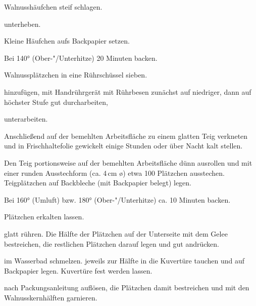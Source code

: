 \begin{recipe}{Walnusshäufchen}
  steif schlagen.

  unterheben.

  Kleine Häufchen aufs Backpapier setzen.

  Bei 140° (Ober-"/Unterhitze) 20 Minuten backen.
\end{recipe}



\begin{recipe}{Walnussplätzchen}
  in eine Rührschüssel sieben.

  hinzufügen, mit Handrührgerät mit Rührbesen zunächst auf niedriger,
  dann auf höchster Stufe gut durcharbeiten,

  unterarbeiten.

  Anschließend auf der bemehlten Arbeitsfläche zu einem glatten Teig
  verkneten und in Frischhaltefolie gewickelt einige Stunden oder über
  Nacht kalt stellen.

  Den Teig portionsweise auf der bemehlten Arbeitsfläche dünn ausrollen
  und mit einer runden Ausstechform (ca. 4\,cm \o) etwa 100 Plätzchen
  ausstechen. Teigplätzchen auf Backbleche (mit Backpapier belegt)
  legen.

  Bei 160° (Umluft) bzw. 180° (Ober-"/Unterhitze) ca. 10 Minuten backen.

  Plätzchen erkalten lassen.

  glatt rühren.
  Die Hälfte der Plätzchen auf der Unterseite mit dem Gelee bestreichen,
  die restlichen Plätzchen darauf legen und gut andrücken.

  im Wasserbad schmelzen.
  jeweils zur Hälfte in die Kuvertüre tauchen und auf Backpapier legen.
  Kuvertüre fest werden lassen.

  nach Packungsanleitung auflösen, die Plätzchen damit bestreichen und
  mit den Walnusskernhälften garnieren.
\end{recipe}



